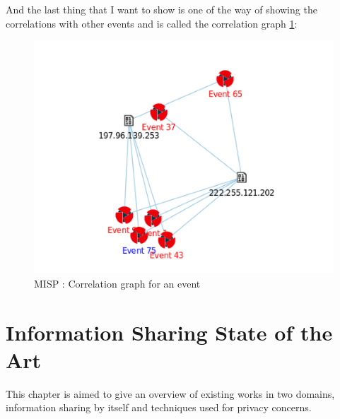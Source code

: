 \documentclass{eplmastersthesis}
\begin{document}
And the last thing that I want to show is one of the way of showing the correlations with other events and is called the correlation graph \ref{webcorrelation}:
\begin{figure}[!h]
	\begin{center}
		\includegraphics[scale=0.35]{res/webCorrelationGraph}
		\caption{MISP : Correlation graph for an event}
		\label{webcorrelation}
	\end{center}
\end{figure}



\chapter{Information Sharing State of the Art}

This chapter is aimed to give an overview of existing works in two domains, information sharing by itself and techniques used for privacy concerns.\\
\end{document}
